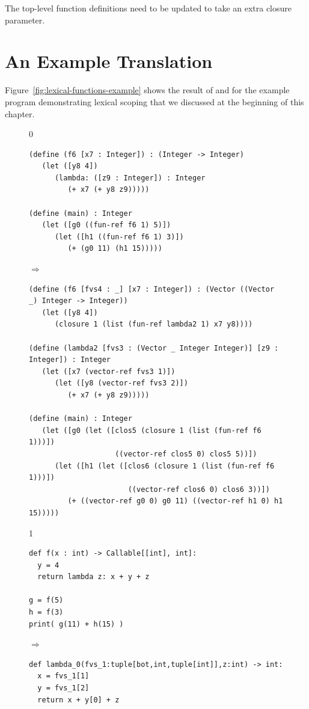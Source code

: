 \documentclass[7x10,nocrop]{TimesAPriori_MIT}%
\def\racketEd{0}
\def\pythonEd{1}
\def\edition{0}
\begin{document}
The top-level function definitions need to be updated to take an extra
closure parameter.

\section{An Example Translation}
\label{sec:example-lambda}

Figure~\ref{fig:lexical-functions-example} shows the result of
 and  for the example
program demonstrating lexical scoping that we discussed at the
beginning of this chapter.


\begin{figure}[tbp]
  \begin{minipage}{0.8\textwidth}
{\if\edition\racketEd
\begin{lstlisting}[basicstyle=\ttfamily\footnotesize]
(define (f6 [x7 : Integer]) : (Integer -> Integer)
   (let ([y8 4])
      (lambda: ([z9 : Integer]) : Integer
         (+ x7 (+ y8 z9)))))

(define (main) : Integer
   (let ([g0 ((fun-ref f6 1) 5)])
      (let ([h1 ((fun-ref f6 1) 3)])
         (+ (g0 11) (h1 15)))))
\end{lstlisting}
$\Rightarrow$
\begin{lstlisting}[basicstyle=\ttfamily\footnotesize]
(define (f6 [fvs4 : _] [x7 : Integer]) : (Vector ((Vector _) Integer -> Integer))
   (let ([y8 4])
      (closure 1 (list (fun-ref lambda2 1) x7 y8))))

(define (lambda2 [fvs3 : (Vector _ Integer Integer)] [z9 : Integer]) : Integer
   (let ([x7 (vector-ref fvs3 1)])
      (let ([y8 (vector-ref fvs3 2)])
         (+ x7 (+ y8 z9)))))

(define (main) : Integer
   (let ([g0 (let ([clos5 (closure 1 (list (fun-ref f6 1)))])
                    ((vector-ref clos5 0) clos5 5))])
      (let ([h1 (let ([clos6 (closure 1 (list (fun-ref f6 1)))])
                       ((vector-ref clos6 0) clos6 3))])
         (+ ((vector-ref g0 0) g0 11) ((vector-ref h1 0) h1 15)))))
\end{lstlisting}
\fi}
%
{\if\edition\pythonEd
\begin{lstlisting}
def f(x : int) -> Callable[[int], int]:
  y = 4
  return lambda z: x + y + z

g = f(5)
h = f(3)
print( g(11) + h(15) )
\end{lstlisting}
$\Rightarrow$
\begin{lstlisting}
def lambda_0(fvs_1:tuple[bot,int,tuple[int]],z:int) -> int:
  x = fvs_1[1]
  y = fvs_1[2]
  return x + y[0] + z


\end{lstlisting}}
\end{minipage}
\end{figure}
\end{document}
